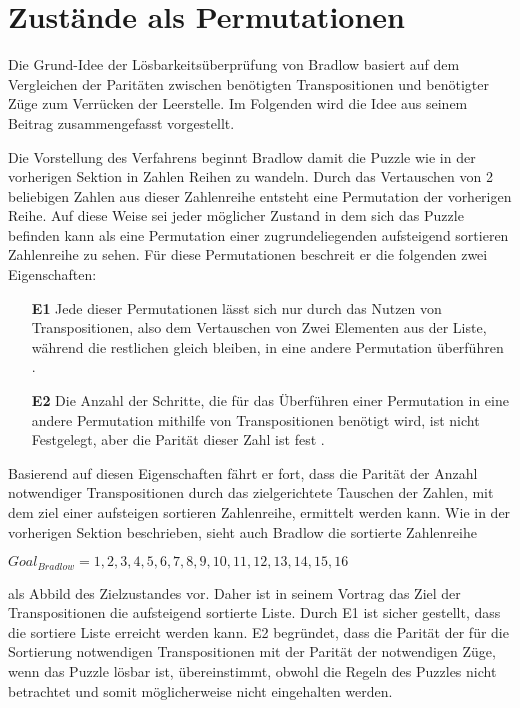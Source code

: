 \section{Zustände als Permutationen} %
\label{sec:Permutation}
Die Grund-Idee der Lösbarkeitsüberprüfung von Bradlow basiert auf dem Vergleichen der Paritäten zwischen benötigten Transpositionen und benötigter Züge zum Verrücken der Leerstelle. Im Folgenden wird die Idee aus seinem Beitrag \autocite{Unsolvable-14-15-Numberphile-YT:online} zusammengefasst vorgestellt.\WNL

Die Vorstellung des Verfahrens beginnt Bradlow damit die Puzzle wie in der vorherigen Sektion in Zahlen Reihen zu wandeln. Durch das Vertauschen von 2 beliebigen Zahlen aus dieser Zahlenreihe entsteht eine Permutation der vorherigen Reihe. Auf diese Weise sei jeder möglicher Zustand in dem sich das Puzzle befinden kann als eine Permutation einer zugrundeliegenden aufsteigend sortieren Zahlenreihe zu sehen. Für diese Permutationen beschreit er die folgenden zwei Eigenschaften:
\begin{enumerate}
	\item[\textbf{E1}] Jede dieser Permutationen lässt sich nur durch das Nutzen von Transpositionen, also dem Vertauschen von Zwei Elementen aus der Liste, während die restlichen gleich bleiben, in eine andere Permutation überführen \cite[Vgl.][7min,07sec]{Unsolvable-14-15-Numberphile-YT:online}.
	\item[\textbf{E2}] Die Anzahl der Schritte, die für das Überführen einer Permutation in eine andere Permutation mithilfe von Transpositionen benötigt wird, ist nicht Festgelegt, aber die Parität dieser Zahl ist fest \cite[Vgl.][10min,13sec]{Unsolvable-14-15-Numberphile-YT:online}.
\end{enumerate}
Basierend auf diesen Eigenschaften fährt er fort, dass die Parität der Anzahl notwendiger Transpositionen durch das zielgerichtete Tauschen der Zahlen, mit dem ziel einer aufsteigen sortieren Zahlenreihe, ermittelt werden kann. Wie in der vorherigen Sektion beschrieben, sieht auch Bradlow die sortierte Zahlenreihe
\begin{center}
	$Goal_{Bradlow} = {1,2,3,4,5,6,7,8,9,10,11,12,13,14,15,16}$
\end{center}
als Abbild des Zielzustandes vor. Daher ist in seinem Vortrag das Ziel der Transpositionen die aufsteigend sortierte Liste. Durch E1 ist sicher gestellt, dass die sortiere Liste erreicht werden kann. E2 begründet, dass die Parität der für die Sortierung notwendigen Transpositionen mit der Parität der notwendigen Züge, wenn das Puzzle lösbar ist, übereinstimmt, obwohl die Regeln des Puzzles nicht betrachtet und somit möglicherweise nicht eingehalten werden.\WNL
